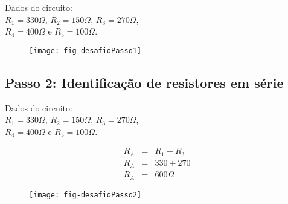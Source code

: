 \begin{minipage}{\linewidth}
  \centering
  \begin{minipage}{0.45\linewidth}
    Dados do circuito: \\
                $R_1 = 330\Omega$,
                $R_2 = 150\Omega$,
                $R_3 = 270\Omega$, \\
                $R_4 = 400\Omega$ e
                $R_5 = 100\Omega$.
  \end{minipage}
  \hspace{0.05\linewidth}
  \begin{minipage}{0.45\linewidth}
    \begin{figure}[H]
      \centering
      \texttt{[image: fig-desafioPasso1]}
    \end{figure}
  \end{minipage}
\end{minipage}










\subsection{Passo 2: Identificação de resistores em série}

\begin{minipage}{\linewidth}
  \centering
  \begin{minipage}{0.45\linewidth}
    Dados do circuito: \\
                $R_1 = 330\Omega$,
                $R_2 = 150\Omega$,
                $R_3 = 270\Omega$, \\
                $R_4 = 400\Omega$ e
                $R_5 = 100\Omega$.

      \begin{eqnarray}
        R_A & = & R_1 + R_3 \nonumber\\
        R_A & = & 330 + 270 \nonumber\\
        R_A & = & 600\Omega \nonumber
      \end{eqnarray}

  \end{minipage}
  \hspace{0.05\linewidth}
  \begin{minipage}{0.45\linewidth}
    \begin{figure}[H]
      \centering
      \texttt{[image: fig-desafioPasso2]}
    \end{figure}
  \end{minipage}
\end{minipage}







